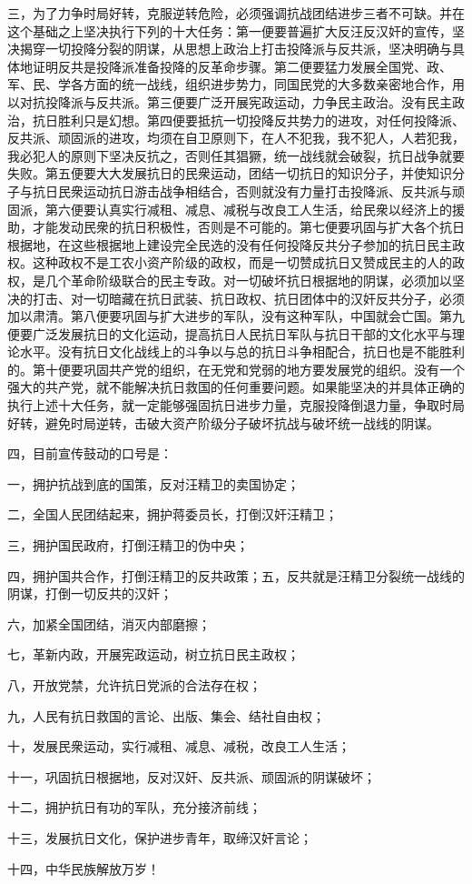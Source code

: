 三，为了力争时局好转，克服逆转危险，必须强调抗战团结进步三者不可缺。并在这个基础之上坚决执行下列的十大任务：第一便要普遍扩大反汪反汉奸的宣传，坚决揭穿一切投降分裂的阴谋，从思想上政治上打击投降派与反共派，坚决明确与具体地证明反共是投降派准备投降的反革命步骤。第二便要猛力发展全国党、政、军、民、学各方面的统一战线，组织进步势力，同国民党的大多数亲密地合作，用以对抗投降派与反共派。第三便要广泛开展宪政运动，力争民主政治。没有民主政治，抗日胜利只是幻想。第四便要抵抗一切投降反共势力的进攻，对任何投降派、反共派、顽固派的进攻，均须在自卫原则下，在人不犯我，我不犯人，人若犯我，我必犯人的原则下坚决反抗之，否则任其猖獗，统一战线就会破裂，抗日战争就要失败。第五便要大大发展抗日的民衆运动，团结一切抗日的知识分子，并使知识分子与抗日民衆运动抗日游击战争相结合，否则就没有力量打击投降派、反共派与顽固派，第六便要认真实行减租、减息、减税与改良工人生活，给民衆以经济上的援助，才能发动民衆的抗日积极性，否则是不可能的。第七便要巩固与扩大各个抗日根据地，在这些根据地上建设完全民选的没有任何投降反共分子参加的抗日民主政权。这种政权不是工农小资产阶级的政权，而是一切赞成抗日又赞成民主的人的政权，是几个革命阶级联合的民主专政。对一切破坏抗日根据地的阴谋，必须加以坚决的打击、对一切暗藏在抗日武装、抗日政权、抗日团体中的汉奸反共分子，必须加以肃清。第八便要巩固与扩大进步的军队，没有这种军队，中国就会亡国。第九便要广泛发展抗日的文化运动，提高抗日人民抗日军队与抗日干部的文化水平与理论水平。没有抗日文化战线上的斗争以与总的抗日斗争相配合，抗日也是不能胜利的。第十便要巩固共产党的组织，在无党和党弱的地方要发展党的组织。没有一个强大的共产党，就不能解决抗日救国的任何重要问题。如果能坚决的并具体正确的执行上述十大任务，就一定能够强固抗日进步力量，克服投降倒退力量，争取时局好转，避免时局逆转，击破大资产阶级分子破坏抗战与破坏统一战线的阴谋。

四，目前宣传鼓动的口号是：

一，拥护抗战到底的国策，反对汪精卫的卖国协定；

二，全国人民团结起来，拥护蒋委员长，打倒汉奸汪精卫；

三，拥护国民政府，打倒汪精卫的伪中央；

四，拥护国共合作，打倒汪精卫的反共政策；五，反共就是汪精卫分裂统一战线的阴谋，打倒一切反共的汉奸；

六，加紧全国团结，消灭内部磨擦；

七，革新内政，开展宪政运动，树立抗日民主政权；

八，开放党禁，允许抗日党派的合法存在权；

九，人民有抗日救国的言论、出版、集会、结社自由权；

十，发展民衆运动，实行减租、减息、减税，改良工人生活；

十一，巩固抗日根据地，反对汉奸、反共派、顽固派的阴谋破坏；

十二，拥护抗日有功的军队，充分接济前线；

十三，发展抗日文化，保护进步青年，取缔汉奸言论；

十四，中华民族解放万岁！
